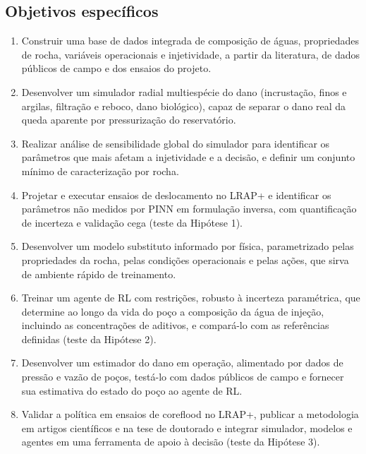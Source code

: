 \documentclass[10pt,a4paper]{article}
\begin{document}
\subsection{Objetivos específicos}
\begin{enumerate}[label=OE\arabic*., leftmargin=*, widest=8, labelsep=0.5em]
  \item Construir uma base de dados integrada de composição de águas, propriedades de
        rocha, variáveis operacionais e injetividade, a partir da literatura, de dados
        públicos de campo e dos ensaios do projeto.
  \item Desenvolver um simulador radial multiespécie do
        dano (incrustação, finos e argilas, filtração e reboco, dano biológico), capaz de
        separar o dano real da queda aparente por pressurização do reservatório.
  \item Realizar análise de sensibilidade global do simulador para identificar os
        parâmetros que mais afetam a injetividade e a decisão, e definir um conjunto
        mínimo de caracterização por rocha.
  \item Projetar e executar ensaios de deslocamento no LRAP+ e identificar os parâmetros
        não medidos por PINN em formulação inversa, com quantificação de incerteza e
        validação cega (teste da Hipótese 1).
  \item Desenvolver um modelo substituto informado por física, parametrizado pelas
        propriedades da rocha, pelas condições operacionais e pelas ações, que sirva de
        ambiente rápido de treinamento.
  \item Treinar um agente de RL com restrições, robusto à incerteza paramétrica, que
        determine ao longo da vida do poço a composição da água de injeção, incluindo as concentrações de aditivos, e compará-lo com as referências
        definidas (teste da Hipótese 2).
  \item Desenvolver um estimador do dano em operação, alimentado por dados de pressão e
        vazão de poços, testá-lo com dados públicos de campo e fornecer sua estimativa do estado do poço ao agente de RL.
  \item Validar a política em ensaios de coreflood no LRAP+, publicar a metodologia em artigos
        científicos e na tese de doutorado e integrar simulador, modelos e agentes em uma
        ferramenta de apoio à decisão (teste da Hipótese 3).
\end{enumerate}

\end{document}
